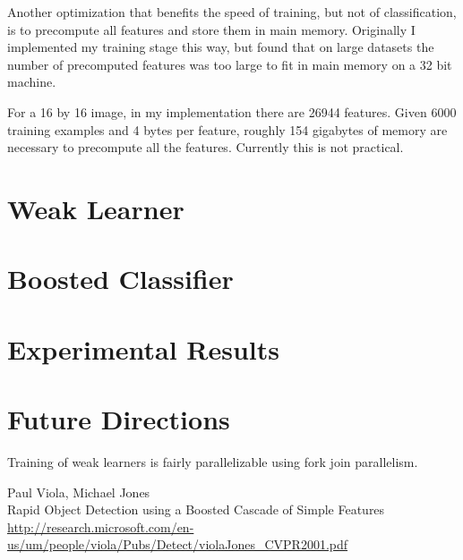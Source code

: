 \documentclass{article}
\begin{document}
Another optimization that benefits the speed of training, but not of
classification, is to precompute all features and store them in main
memory. Originally I implemented my training stage this way, but found
that on large datasets the number of precomputed features was too
large to fit in main memory on a 32 bit machine.

For a 16 by 16 image, in my implementation there are 26944
features. Given 6000 training examples and 4 bytes per feature,
roughly 154 gigabytes of memory are necessary to precompute all the
features. Currently this is not practical.

\section{Weak Learner}
\label{sec:weaklearner}

\section{Boosted Classifier}
\label{sec:boosting}

\section{Experimental Results}

\section{Future Directions}

Training of weak learners is fairly parallelizable using fork join
parallelism. 

\begin{thebibliography}{9}

  Paul Viola, Michael Jones\\
  Rapid Object Detection using a Boosted Cascade of Simple Features\\
  \url{http://research.microsoft.com/en-us/um/people/viola/Pubs/Detect/violaJones_CVPR2001.pdf}

\end{thebibliography}
\end{document}
